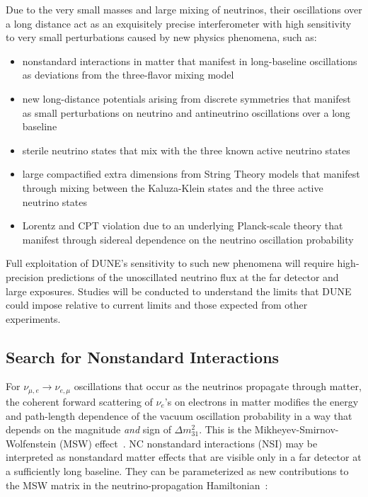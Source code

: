 Due to the very small masses and large mixing of neutrinos, their oscillations over a long distance
  act as an exquisitely precise interferometer with high sensitivity to very small perturbations caused by 
  new physics phenomena, such as:
  \begin{itemize}
  \item nonstandard interactions in matter that manifest in
    long-baseline oscillations as deviations from the three-flavor mixing model
  \item new long-distance potentials arising from discrete symmetries
    that manifest as small perturbations on neutrino and antineutrino
    oscillations over a long baseline
  \item sterile neutrino states that mix with the three known active neutrino states
  \item large compactified extra dimensions from String Theory models that manifest through mixing
    between the Kaluza-Klein states and the three active neutrino
    states
   \item Lorentz and CPT violation due to an underlying Planck-scale theory that manifest through sidereal dependence on the neutrino oscillation probability
  \end{itemize}
  
  Full exploitation of DUNE's sensitivity to such new phenomena
  will require high-precision predictions of the unoscillated
  neutrino flux at the far detector and large exposures. Studies will be conducted to understand the
limits that DUNE could impose relative to current limits and those expected from other experiments.
  
\subsection{Search for Nonstandard Interactions}

For $\nu_{\mu,e} \rightarrow \nu_{e,\mu}$ 
oscillations that occur as the neutrinos propagate through matter,  
the coherent forward scattering of $\nu_e$'s on electrons in matter 
modifies the energy and path-length dependence of the vacuum oscillation 
probability in a way that depends on the magnitude \emph{and} sign of $\Delta m^2_{31}$. 
This is  the Mikheyev-Smirnov-Wolfenstein (MSW) effect~\cite{Mikheev:1986gs,Wolfenstein:1977ue}.
NC nonstandard interactions (NSI) may be interpreted as nonstandard
matter effects that are visible only in a far detector at a
sufficiently long baseline. 
They can be parameterized as new contributions
to the MSW matrix in the neutrino-propagation Hamiltonian~\cite{Valle:1987gv,Roulet:1991sm}:

